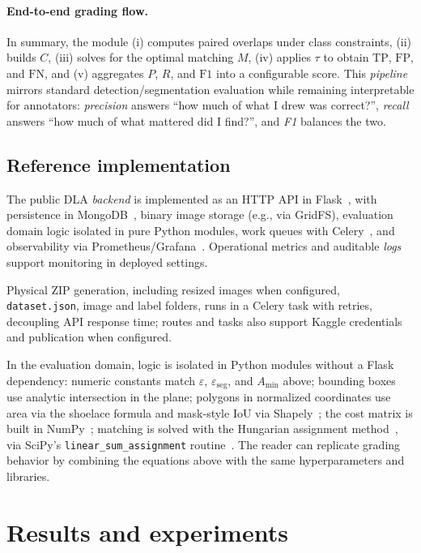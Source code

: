 \documentclass[runningheads]{llncs}
\begin{document}
\paragraph{End-to-end grading flow.}
In summary, the module (i) computes paired overlaps under class constraints, (ii) builds $C$, (iii) solves for the optimal matching $M$, (iv) applies $\tau$ to obtain $\mathrm{TP}$, $\mathrm{FP}$, and $\mathrm{FN}$, and (v) aggregates $P$, $R$, and $\mathrm{F1}$ into a configurable score. This \textit{pipeline} mirrors standard detection/segmentation evaluation while remaining interpretable for annotators: \emph{precision} answers ``how much of what I drew was correct?'', \emph{recall} answers ``how much of what mattered did I find?'', and \emph{F1} balances the two.

\subsection{Reference implementation}

The public DLA \emph{backend} is implemented as an HTTP API in Flask~\cite{flask}, with persistence in MongoDB~\cite{mongodb}, binary image storage (e.g., via GridFS), evaluation domain logic isolated in pure Python modules, work queues with Celery~\cite{celery}, and observability via Prometheus/Grafana~\cite{prometheus,grafana}. Operational metrics and auditable \textit{logs} support monitoring in deployed settings.

Physical ZIP generation, including resized images when configured, \texttt{dataset.json}, image and label folders, runs in a Celery task with retries, decoupling API response time; routes and tasks also support Kaggle credentials and publication when configured.

In the evaluation domain, logic is isolated in Python modules without a Flask dependency: numeric constants match $\varepsilon$, $\varepsilon_{\mathrm{seg}}$, and $A_{\min}$ above; bounding boxes use analytic intersection in the plane; polygons in normalized coordinates use area via the shoelace formula and mask-style IoU via Shapely~\cite{shapely}; the cost matrix is built in NumPy~\cite{harris2020array}; matching is solved with the Hungarian assignment method~\cite{kuhn1955hungarian}, via SciPy's \texttt{linear\_sum\_assignment} routine~\cite{virtanen2020scipy}. The reader can replicate grading behavior by combining the equations above with the same hyperparameters and libraries.

\section{Results and experiments}\label{sec:res}
\end{document}
